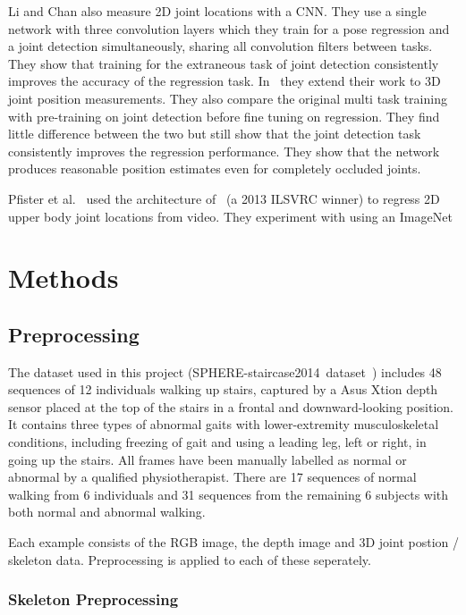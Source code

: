 \documentclass[11pt]{article} %
\begin{document}
Li and Chan also measure 2D joint locations with a CNN. They use a single network with three convolution layers which they train for a pose regression and a joint detection simultaneously, sharing all convolution filters between tasks. They show that training for the extraneous task of joint detection consistently improves the accuracy of the regression task. In~\cite{Accv2014} they extend their work to 3D joint position measurements. They also compare the original multi task training with pre-training on joint detection before fine tuning on regression. They find little difference between the two but still show that the joint detection task consistently improves the regression performance. They show that the network produces reasonable position estimates even for completely occluded joints. 

Pfister et al.~\cite{Pfister} used the architecture of~\cite{Sermanet2013a} (a 2013 ILSVRC winner) to regress 2D upper body joint locations from video. They experiment with using an ImageNet 



\section{Methods}

\subsection{Preprocessing}
\label{sec:preprocessing}

The dataset used in this project (SPHERE-staircase2014~dataset~\cite{Paiement}) includes 48 sequences of 12 individuals walking up stairs, captured by a Asus Xtion depth sensor placed at the top of the stairs in a frontal and downward-looking position. It contains three types of abnormal gaits with lower-extremity musculoskeletal conditions, including freezing of gait and using a leading leg, left or right, in going up the stairs. All frames have been manually labelled as normal or abnormal by a qualified physiotherapist. There are 17 sequences of normal walking from 6 individuals and 31 sequences from the remaining 6 subjects with both normal and abnormal walking.

Each example consists of the RGB image, the depth image and 3D joint postion / skeleton data. Preprocessing is applied to each of these seperately.

\subsubsection{Skeleton Preprocessing}
\end{document}
